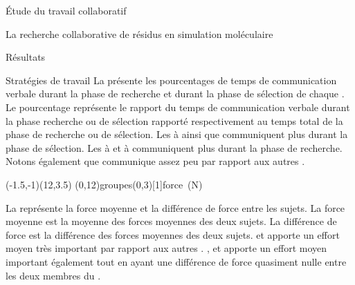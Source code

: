\documentclass[myfrancais]{mythesis}
\begin{document}
\begin{mypart}{Étude du travail collaboratif}
\begin{mychapter}{La recherche collaborative de résidus en simulation moléculaire}
\begin{mysection}{Résultats}
\begin{mysubsection}{Stratégies de travail}
					La  présente les pourcentages de temps de communication verbale durant la phase de recherche et durant la phase de sélection de chaque .
					Le pourcentage représente le rapport du temps de communication verbale durant la phase recherche ou de sélection rapporté respectivement au temps total de la phase de recherche ou de sélection.
					Les   à  ainsi que  communiquent plus durant la phase de sélection.
					Les   à  et  à  communiquent plus durant la phase de recherche.
					Notons également que  communique assez peu par rapport aux autres .

					\begin{myfigure}
						\begin{myps}(-1.5,-1)(12,3.5)
							\myaxes(0,12){groupes}(0,3)[1]{force~(N)}
						\end{myps}
					\end{myfigure}

					La  représente la force moyenne et la différence de force entre les sujets.
					La force moyenne est la moyenne des forces moyennes des deux sujets.
					La différence de force est la différence des forces moyennes des deux sujets.
					 et  apporte un effort moyen très important par rapport aux autres .
					,  et  apporte un effort moyen important également tout en ayant une différence de force quasiment nulle entre les deux membres du .


\end{mysubsection}
\end{mysection}
\end{mychapter}
\end{mypart}
\end{document}
